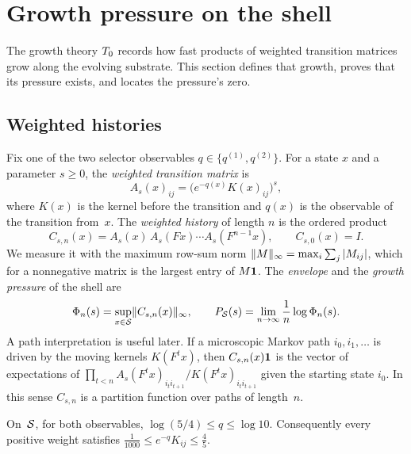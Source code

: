 \section{Growth pressure on the shell}\label{sec:pressure}

The growth theory $T_0$ records how fast products of weighted transition matrices grow along the evolving substrate. This section defines that growth, proves that its pressure exists, and locates the pressure's zero.

\subsection{Weighted histories}

Fix one of the two selector observables $q\in\{q^{(1)},q^{(2)}\}$. For a state $x$ and a parameter $s\ge0$, the \emph{weighted transition matrix} is
\[
A_s(x)_{ij}=\bigl(e^{-q(x)}K(x)_{ij}\bigr)^{s},
\]
where $K(x)$ is the kernel before the transition and $q(x)$ is the observable of the transition from~$x$. The \emph{weighted history} of length $n$ is the ordered product
\[
C_{s,n}(x)=A_s(x)\,A_s(Fx)\cdots A_s(F^{n-1}x),\qquad C_{s,0}(x)=I.
\]
We measure it with the maximum row-sum norm $\lVert M\rVert_{\infty}=\max_i\sum_j|M_{ij}|$, which for a nonnegative matrix is the largest entry of $M\mathbf{1}$. The \emph{envelope} and the \emph{growth pressure} of the shell are
\[
\Phi_n(s)=\sup_{x\in\mathcal{S}}\lVert C_{s,n}(x)\rVert_{\infty},\qquad
P_{\mathcal{S}}(s)=\lim_{n\to\infty}\frac1n\log\Phi_n(s).
\]
A path interpretation is useful later. If a microscopic Markov path $i_0,i_1,\dots$ is driven by the moving kernels $K(F^tx)$, then $C_{s,n}(x)\mathbf{1}$ is the vector of expectations of $\prod_{t<n}A_s(F^tx)_{i_ti_{t+1}}/K(F^tx)_{i_ti_{t+1}}$ given the starting state $i_0$. In this sense $C_{s,n}$ is a partition function over paths of length~$n$.

\begin{lemma}\label{lem:branch-bounds}
On~$\mathcal{S}$, for both observables, $\log(5/4)\le q\le\log 10$. Consequently every positive weight satisfies $\tfrac1{1000}\le e^{-q}K_{ij}\le\tfrac45$.
\end{lemma}

